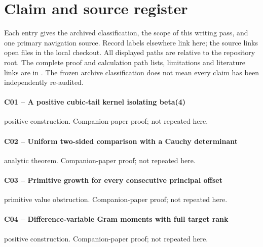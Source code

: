 \section{Claim and source register}\label{app:register}
Each entry gives the archived classification, the scope of this writing pass,
and one primary navigation source. Record labels elsewhere link here;
the source links open files in the local checkout. All displayed paths
are relative to the repository root.
The complete proof and calculation path lists, limitations and literature links
are in . The frozen archive classification
does not mean every claim has been independently re-audited.
\paragraph{C01 -- A positive cubic-tail kernel isolating beta(4)}\label{record-C01}
positive construction. Companion-paper proof; not repeated here.
\par\smallskip{}\par
\paragraph{C02 -- Uniform two-sided comparison with a Cauchy determinant}\label{record-C02}
analytic theorem. Companion-paper proof; not repeated here.
\par\smallskip{}\par
\paragraph{C03 -- Primitive growth for every consecutive principal offset}\label{record-C03}
primitive value obstruction. Companion-paper proof; not repeated here.
\par\smallskip{}\par
\paragraph{C04 -- Difference-variable Gram moments with full target rank}\label{record-C04}
positive construction. Companion-paper proof; not repeated here.
\par\smallskip{}\par
